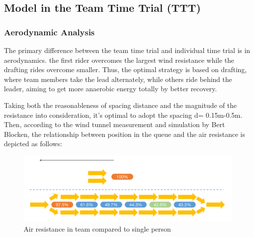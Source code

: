 \documentclass{mcmthesis}
\begin{document}
\subsection{Model in the Team Time Trial (TTT)}
\subsubsection{Aerodynamic Analysis}
\par The primary difference between the team time trial and individual time trial is in aerodynamics. the first rider overcomes the largest wind resistance while the drafting rides overcome smaller. Thus, the optimal strategy is based on drafting, where team members take the lead alternately, while others ride behind the leader, aiming to get more anaerobic energy totally by better recovery.
\par Taking both the reasonableness of spacing distance and the magnitude of the resistance into consideration, it's optimal to adopt the spacing d= 0.15m-0.5m. Then, according to the wind tunnel measurement and simulation by Bert Blocken\cite{blocken_aerodynamic_2018}, the relationship between position in the queue and the air resistance is depicted as follows:
\begin{figure}[H]
\small
\centering
\includegraphics[width=12cm]{mcmthesis/figures/wind friction.png}
\caption{Air resistance in team compared to single person} 
\end{figure}
\end{document}
